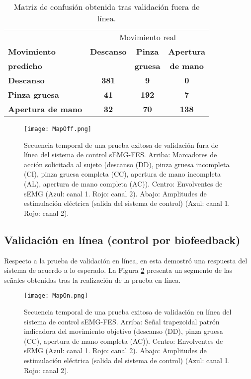 \begin{table}[htbp]
	\centering
\begin{tabular}{|l|c|c|c|}
	\hline
	\textbf{} & \multicolumn{3}{|c|}{Movimiento real}\\
	\textbf{Movimiento} & \textbf{Descanso} & \textbf{Pinza} & \textbf{Apertura}\\
	\textbf{predicho} & \textbf{} & \textbf{gruesa} & \textbf{de mano}\\ \hline \hline
	\textbf{Descanso} & \textbf{381} & \textbf{9} & \textbf{0}\\ \hline
	\textbf{Pinza gruesa} & \textbf{41} & \textbf{192} & \textbf{7}\\ \hline
	\textbf{Apertura de mano} & \textbf{32} & \textbf{70} & \textbf{138}\\ \hline
	\end{tabular}
	\caption{Matriz de confusión obtenida tras validación fuera de línea.}
	\label{Cuadro:PorcentajesValores}
\end{table}

\begin{figure}[htbp]
	\centering
	\texttt{[image: MapOff.png]}
	\caption[Secuencia temporal de una prueba exitosa de validación fuera de línea]{Secuencia temporal de una prueba exitosa de validación fura de línea del sistema de control sEMG-FES. Arriba: Marcadores de acción solicitada al sujeto (descanso (DD), pinza gruesa incompleta (CI), pinza gruesa completa (CC), apertura de mano incompleta (AL), apertura de mano completa (AC)). Centro: Envolventes de sEMG (Azul: canal 1. Rojo: canal 2). Abajo: Amplitudes de estimulación eléctrica (salida del sistema de control) (Azul: canal 1. Rojo: canal 2). }
	\label{Figura: MapOff}
\end{figure}


\newpage
\subsection{Validación en línea (control por biofeedback)}
Respecto a la prueba de validación en línea, en esta demostró una respuesta del sistema de acuerdo a lo esperado. La Figura \ref{Figura: MapOn} presenta un segmento de las señales obtenidas tras la realización de la prueba en línea.

\begin{figure}[htbp]
	\centering
	\texttt{[image: MapOn.png]}
	\caption[Secuencia temporal de una prueba exitosa de validación en línea]{Secuencia temporal de una prueba exitosa de validación en línea del sistema de control sEMG-FES.  Arriba: Señal trapezoidal patrón indicadora del movimiento objetivo (descanso (DD), pinza gruesa (CC), apertura de mano completa (AC)). Centro: Envolventes de sEMG (Azul: canal 1. Rojo: canal 2). Abajo: Amplitudes de estimulación eléctrica (salida del sistema de control) (Azul: canal 1. Rojo: canal 2).}
	\label{Figura: MapOn}
\end{figure}


